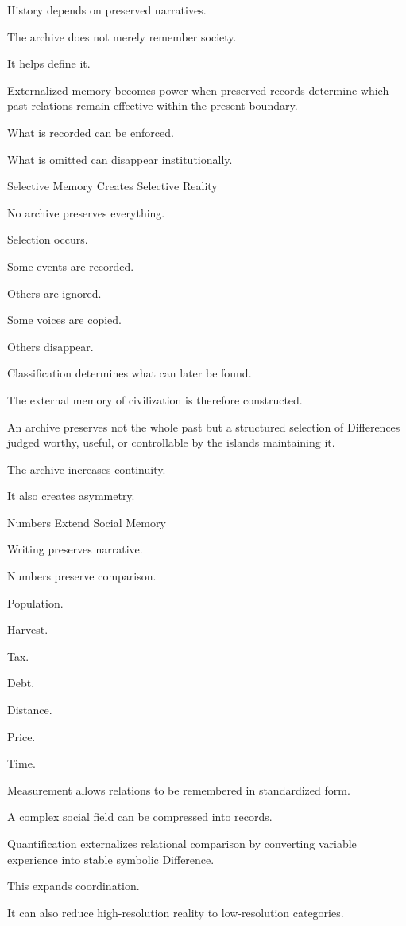 History depends on preserved narratives.

The archive does not merely remember society.

It helps define it.

Externalized memory becomes power when preserved records determine which past relations remain effective within the present boundary.

What is recorded can be enforced.

What is omitted can disappear institutionally.

Selective Memory Creates Selective Reality

No archive preserves everything.

Selection occurs.

Some events are recorded.

Others are ignored.

Some voices are copied.

Others disappear.

Classification determines what can later be found.

The external memory of civilization is therefore constructed.

An archive preserves not the whole past but a structured selection of Differences judged worthy, useful, or controllable by the islands maintaining it.

The archive increases continuity.

It also creates asymmetry.

Numbers Extend Social Memory

Writing preserves narrative.

Numbers preserve comparison.

Population.

Harvest.

Tax.

Debt.

Distance.

Price.

Time.

Measurement allows relations to be remembered in standardized form.

A complex social field can be compressed into records.

Quantification externalizes relational comparison by converting variable experience into stable symbolic Difference.

This expands coordination.

It can also reduce high-resolution reality to low-resolution categories.

